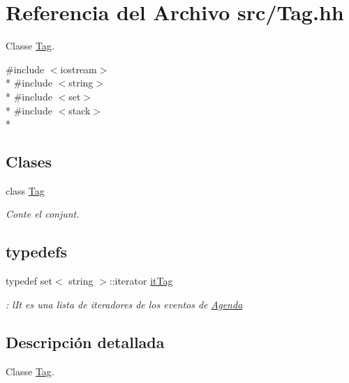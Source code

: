 \hypertarget{_tag_8hh}{}\section{Referencia del Archivo src/\+Tag.hh}
\label{_tag_8hh}


Classe \hyperlink{class_tag}{Tag}.  


{\ttfamily \#include $<$iostream$>$}\\*
{\ttfamily \#include $<$string$>$}\\*
{\ttfamily \#include $<$set$>$}\\*
{\ttfamily \#include $<$stack$>$}\\*
\subsection*{Clases}
\begin{DoxyCompactItemize}
\item 
class \hyperlink{class_tag}{Tag}
\begin{DoxyCompactList}\small\item\em Conte el conjunt. \end{DoxyCompactList}\end{DoxyCompactItemize}
\subsection*{\textquotesingle{}typedefs\textquotesingle{}}
\begin{DoxyCompactItemize}
\item 
\hypertarget{_tag_8hh_aa1ffaea98934d2496035b29e4bee1786}{}typedef set$<$ string $>$\+::iterator \hyperlink{_tag_8hh_aa1ffaea98934d2496035b29e4bee1786}{it\+Tag}\label{_tag_8hh_aa1ffaea98934d2496035b29e4bee1786}

\begin{DoxyCompactList}\small\item\em \+: l\+It es una lista de iteradores de los eventos de \hyperlink{class_agenda}{Agenda} \end{DoxyCompactList}\end{DoxyCompactItemize}


\subsection{Descripción detallada}
Classe \hyperlink{class_tag}{Tag}. 

